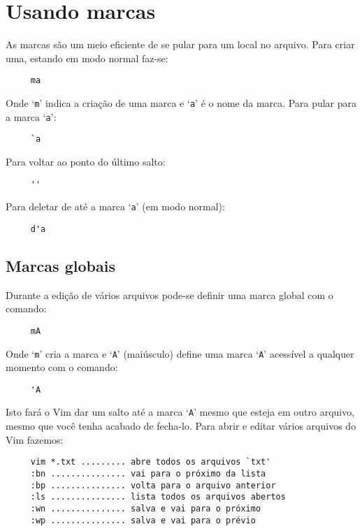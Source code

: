 \section{Usando marcas}
\label{sec:UsandoMarcas}

As marcas são um meio eficiente de se pular para um local no arquivo. Para
criar uma,  estando em modo normal faz-se:

\begin{verbatim}
     ma
\end{verbatim}

Onde `{\tt m}' indica a criação de uma marca e `{\tt a}' é o nome da marca.
Para pular para a marca `{\tt a}':

\begin{verbatim}
     `a
\end{verbatim}

Para voltar ao ponto do último salto:

\begin{verbatim}
     ''
\end{verbatim}

Para deletar de até a marca `{\tt a}' (em modo normal):

\begin{verbatim}
     d'a
\end{verbatim}

\subsection{Marcas globais}

Durante a edição de vários arquivos pode-se definir uma marca global com o
comando:

\begin{verbatim}
     mA
\end{verbatim}

Onde `{\tt m}' cria a marca e `{\tt A}' (maiúsculo) define uma marca `{\tt A}'
acessível a qualquer momento com o comando:

\begin{verbatim}
     'A
\end{verbatim}

Isto fará o Vim dar um salto até a marca `{\tt A}' mesmo que esteja em outro arquivo,
mesmo que você tenha acabado de fecha-lo. Para abrir e editar vários arquivos
do Vim fazemos:

\begin{verbatim}
     vim *.txt ......... abre todos os arquivos `txt'
     :bn ............... vai para o próximo da lista
     :bp ............... volta para o arquivo anterior
     :ls ............... lista todos os arquivos abertos
     :wn ............... salva e vai para o próximo
     :wp ............... salva e vai para o prévio
\end{verbatim}

